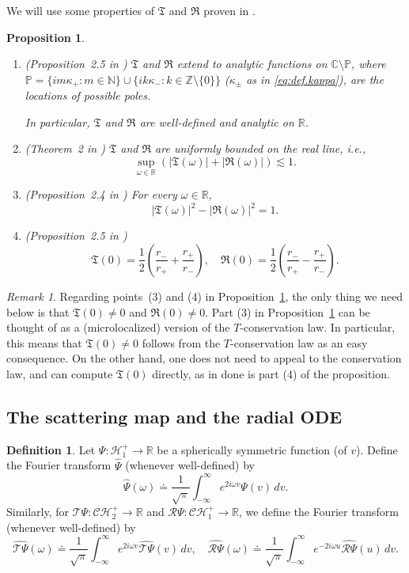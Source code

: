 \documentclass[10pt, reqno]{amsart}
\newtheorem{proposition}[theorem]{Proposition}
\theoremstyle{definition}
\newtheorem{definition}[theorem]{Definition}
\theoremstyle{remark}
\newtheorem{remark}[theorem]{Remark}
\numberwithin{equation}{section}
\def\ls{\lesssim}
\newcommand{\0}{\emptyset}
\newcommand{\om}{\omega}
\newcommand{\calC}{\mathcal C}
\newcommand{\calH}{\mathcal H}
\newcommand{\f}{\frac}
\newcommand{\CH}{\calC \calH^{+}}		%
\newcommand{\EH}{\calH^{+}}
\begin{document}
We will use some properties of $\mathfrak T$ and $\mathfrak R$ proven in \cite{KSR}.
\begin{proposition}\label{prop:basic.T.R}
\begin{enumerate}
\item (Proposition~2.5 in \cite{KSR})  $\mathfrak T$ and $\mathfrak R$ extend to analytic functions on $\mathbb C\setminus \mathbb P$, where $\mathbb P = \{im\kappa_+ : m \in \mathbb N\} \cup \{ ik\kappa_-: k\in \mathbb Z\setminus \{0\}\}$ ($\kappa_{\pm}$ as in \eqref{eq:def.kappa}), are the locations of possible poles.

In particular, $\mathfrak T$ and $\mathfrak R$ are well-defined and analytic on $\mathbb R$.
\item (Theorem~2 in \cite{KSR}) $\mathfrak T$ and $\mathfrak R$ are uniformly bounded on the real line, i.e.,
$$\sup_{\om \in \mathbb R} (|\mathfrak T(\om)| + |\mathfrak R(\om)|) \ls 1.$$
\item (Proposition~2.4 in \cite{KSR}) For every $\om \in \mathbb R$,
$$|\mathfrak T(\om)|^2 - |\mathfrak R(\om)|^2 = 1.$$
\item (Proposition~2.5 in \cite{KSR}) 
$$\mathfrak T(0) = \f 12 (\f{r_-}{r_+} + \f{r_+}{r_-}),\quad \mathfrak R(0) = \f 12 (\f{r_-}{r_+} - \f{r_+}{r_-}).$$
\end{enumerate}
\end{proposition}

\begin{remark}\label{rmk:use.conservation.for.lower.bd}
Regarding points~(3) and (4) in Proposition~\ref{prop:basic.T.R}, the only thing we need below is that $\mathfrak T(0) \neq 0$ and $\mathfrak R(0)\neq 0$. Part (3) in Proposition~\ref{prop:basic.T.R} can be thought of as a (microlocalized) version of the $T$-conservation law. In particular, this means that $\mathfrak T(0) \neq 0$ follows from the $T$-conservation law as an easy consequence. On the other hand, one does not need to appeal to the conservation law, and can compute $\mathfrak T(0)$ directly, as in done is part (4) of the proposition.
\end{remark}

\subsection{The scattering map and the radial ODE}

\begin{definition}\label{def.fourier.horizon}
Let $\Psi:\EH_1\to \mathbb R$ be a spherically symmetric function (of $v$). Define the Fourier transform $\widehat{\Psi}$ (whenever well-defined) by
$$\widehat{\Psi}(\om)  \doteq  \f{1}{\sqrt{\pi}}\int_{-\infty}^\infty e^{2i \om v} \Psi(v) \, dv.$$
Similarly, for $\mathcal T\Psi:\CH_2\to \mathbb R$ and $\mathcal R\Psi:\CH_1\to \mathbb R$, we define the Fourier transform (whenever well-defined) by
$$\widehat{\mathcal T\Psi}(\om)  \doteq  \f{1}{\sqrt{\pi}}\int_{-\infty}^\infty e^{2i \om v} \widehat{\mathcal T\Psi}(v) \, dv,\quad \widehat{\mathcal R\Psi}(\om)  \doteq  \f{1}{\sqrt{\pi}}\int_{-\infty}^\infty e^{-2i \om u} \widehat{\mathcal R\Psi}(u) \, dv.$$
\end{definition}
\end{document}
